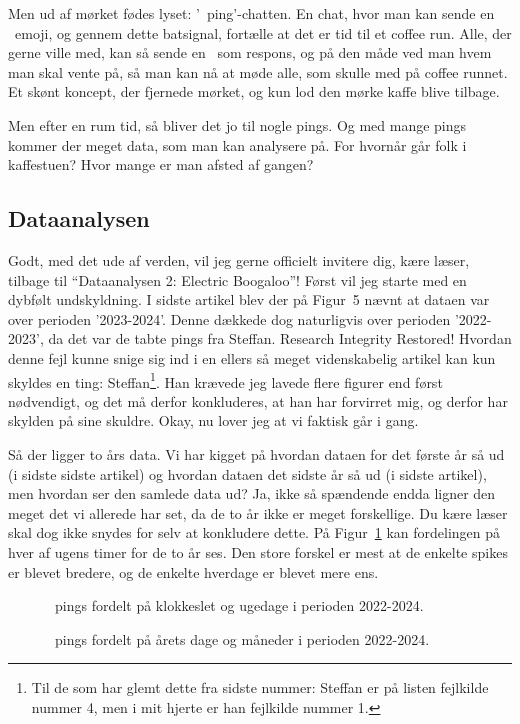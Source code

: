 \begin{article}
Men ud af mørket fødes lyset: '\coffee\ ping'-chatten.
En chat, hvor man kan sende en \coffee\ emoji, og gennem dette batsignal, fortælle at det er tid til et coffee run. Alle, der gerne ville med, kan så sende en \coffee\ som respons, og på den måde ved man hvem man skal vente på, så man kan nå at møde alle, som skulle med på coffee runnet. Et skønt koncept, der fjernede mørket, og kun lod den mørke kaffe blive tilbage.

Men efter en rum tid, så bliver det jo til nogle pings. Og med mange pings kommer der meget data, som man kan analysere på. For hvornår går folk i kaffestuen? Hvor mange er man afsted af gangen?


\subsection*{Dataanalysen}

Godt, med det ude af verden, vil jeg gerne officielt invitere dig, kære læser, tilbage til ``Dataanalysen 2: Electric Boogaloo''!
Først vil jeg starte med en dybfølt undskyldning. I sidste artikel blev der på Figur~5 nævnt at dataen var over perioden '2023-2024'. Denne dækkede dog naturligvis over perioden '2022-2023', da det var de tabte pings fra Steffan. Research Integrity Restored!
Hvordan denne fejl kunne snige sig ind i en ellers så meget videnskabelig artikel kan kun skyldes en ting: Steffan\footnote{Til de som har glemt dette fra sidste nummer: Steffan er på listen fejlkilde nummer 4, men i mit hjerte er han fejlkilde nummer 1.}. Han krævede jeg lavede flere figurer end først nødvendigt, og det må derfor konkluderes, at han har forvirret mig, og derfor har skylden på sine skuldre.
Okay, nu lover jeg at vi faktisk går i gang.

Så der ligger to års data. Vi har kigget på hvordan dataen for det første år så ud (i sidste sidste artikel) og hvordan dataen det sidste år så ud (i sidste artikel), men hvordan ser den samlede data ud? Ja, ikke så spændende endda ligner den meget det vi allerede har set, da de to år ikke er meget forskellige. Du kære læser skal dog ikke snydes for selv at konkludere dette. På Figur~\ref{fig:weekday_analysis_hour_2022-2024} kan fordelingen på hver af ugens timer for de to år ses. Den store forskel er mest at de enkelte spikes er blevet bredere, og de enkelte hverdage er blevet mere ens.

\begin{figure}[H]
	\centering
	\resizebox{\columnwidth}{!}{}
	\vspace{-20pt}
	\caption{\protect\coffee\ pings fordelt på klokkeslet og ugedage i perioden 2022-2024.}
	\label{fig:weekday_analysis_hour_2022-2024}
\end{figure}
\begin{figure}[t!]
	\centering
	\resizebox{2\columnwidth}{!}{}
	\vspace{-15pt}
	\caption{\protect\coffee\ pings fordelt på årets dage og måneder i perioden 2022-2024.}
	\label{fig:year_analysis_2022-2024}
\end{figure}


\end{article}
